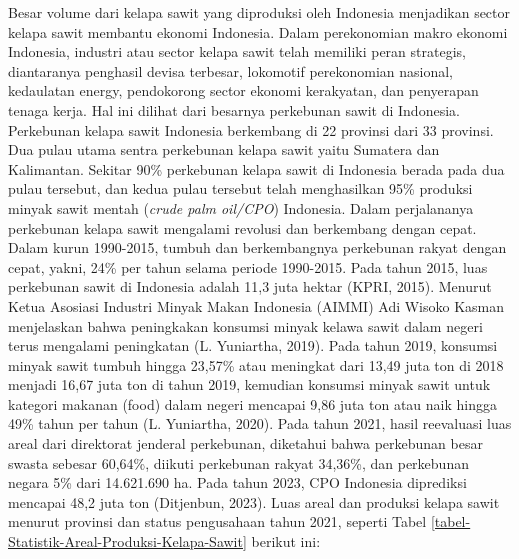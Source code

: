 Besar volume dari kelapa sawit yang diproduksi oleh Indonesia menjadikan sector kelapa sawit membantu ekonomi Indonesia. Dalam perekonomian makro ekonomi Indonesia, industri atau sector kelapa sawit telah memiliki peran strategis, diantaranya penghasil devisa terbesar, lokomotif perekonomian nasional, kedaulatan energy, pendokorong sector ekonomi kerakyatan, dan penyerapan tenaga kerja. Hal ini dilihat dari besarnya perkebunan sawit di Indonesia. Perkebunan kelapa sawit Indonesia berkembang di 22 provinsi dari 33 provinsi. Dua pulau utama sentra perkebunan kelapa sawit yaitu Sumatera dan Kalimantan. Sekitar 90\% perkebunan kelapa sawit di Indonesia berada pada dua pulau tersebut, dan kedua pulau tersebut telah menghasilkan 95\% produksi minyak sawit mentah (\textit{crude palm oil/CPO}) Indonesia. Dalam perjalananya perkebunan kelapa sawit mengalami revolusi dan berkembang dengan cepat. Dalam kurun 1990-2015, tumbuh dan berkembangnya perkebunan rakyat dengan cepat, yakni, 24\% per tahun selama periode 1990-2015. Pada tahun 2015, luas perkebunan sawit di Indonesia adalah 11,3 juta hektar (KPRI, 2015). Menurut Ketua Asosiasi Industri Minyak Makan Indonesia (AIMMI) Adi Wisoko Kasman menjelaskan bahwa peningkakan konsumsi minyak kelawa sawit dalam negeri terus mengalami peningkatan (L. Yuniartha, 2019). Pada tahun 2019, konsumsi minyak sawit tumbuh hingga 23,57\% atau meningkat dari 13,49 juta ton di 2018 menjadi 16,67 juta ton di tahun 2019, kemudian konsumsi minyak sawit untuk kategori makanan (food) dalam negeri mencapai 9,86 juta ton atau naik hingga 49\% tahun per tahun (L. Yuniartha, 2020). Pada tahun 2021, hasil reevaluasi luas areal dari direktorat jenderal perkebunan, diketahui bahwa perkebunan besar swasta sebesar 60,64\%, diikuti perkebunan rakyat 34,36\%, dan perkebunan negara 5\% dari 14.621.690 ha. Pada tahun 2023, CPO Indonesia diprediksi mencapai 48,2 juta ton (Ditjenbun, 2023). Luas areal dan produksi kelapa sawit menurut provinsi dan status pengusahaan tahun 2021, seperti Tabel \ref{tabel-Statistik-Areal-Produksi-Kelapa-Sawit} berikut ini:

